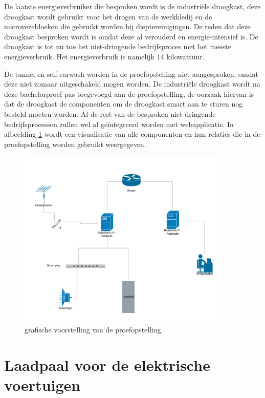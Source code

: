 De laatste energieverbruiker die besproken wordt is de industriële droogkast, deze droogkast wordt gebruikt voor het drogen van de werkkledij en de microvezeldoeken die gebruikt worden bij dieptereinigingen. De reden dat deze droogkast besproken wordt is omdat deze al verouderd en energie-intensief is. De droogkast is tot nu toe het niet-dringende bedrijfsproces met het meeste energieverbruik. Het energieverbruik is namelijk 14 kilowattuur.

\pagebreak

De tunnel en self carwash worden in de proefopstelling niet aangesproken, omdat deze niet zomaar uitgeschakeld mogen worden. De industriële droogkast wordt na deze bachelorproef pas toegevoegd aan de proefopstelling, de oorzaak hiervan is dat de droogkast de componenten om de droogkast smart aan te sturen nog besteld moeten worden. Al de rest van de besproken niet-dringende bedrijfsprocessen zullen wel al geïntegreerd worden met webapplicatie. In afbeelding \ref{fig:Netwedrkdiagram-Opstelling} wordt een visualisatie van alle componenten en hun relaties die in de proefopstelling worden gebruikt weergegeven.

\begin{figure}[h]
    \includegraphics[width=10cm]{./graphics/Netwerkdiagram-Opstelling.png}
    \caption{grafische voorstelling van de proefopstelling.}
    \label{fig:Netwedrkdiagram-Opstelling}
\end{figure}

\section{Laadpaal voor de elektrische voertuigen}
\label{sec:stand-van-zaken-laadpaal}

